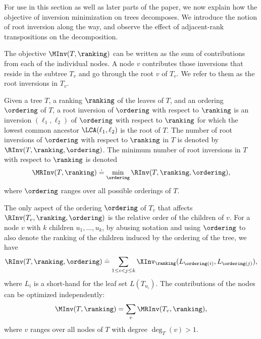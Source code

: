 For use in this section as well as later parts of the paper, we now explain how the objective of inversion minimization on trees decomposes. We introduce the notion of root inversion along the way, and observe the effect of adjacent-rank transpositions on the decomposition.

The objective $\MInv(T,\ranking)$ can be written as the sum of contributions from each of the individual nodes. A node $v$ contributes those inversions that reside in the subtree $T_v$ and go through the root $v$ of $T_v$. We refer to them as the root inversions in $T_v$. 
\begin{definition}
Given a tree $T$, a ranking $\ranking$ of the leaves of $T$, and an ordering $\ordering$ of $T$, a root inversion of $\ordering$ with respect to $\ranking$ is an inversion $(\ell_1,\ell_2)$ of $\ordering$ with respect to $\ranking$ for which the lowest common ancestor $\LCA(\ell_1,\ell_2)$ is the root of $T$. The number of root inversions of $\ordering$ with respect to $\ranking$ in $T$ is denoted by $\RInv(T,\ranking,\ordering)$. The minimum number of root inversions in $T$ with respect to $\ranking$ is denoted 
\begin{equation}\label{eq:MRInv}
\MRInv(T,\ranking) \doteq \min_\ordering \RInv(T,\ranking,\ordering),
\end{equation}
where $\ordering$ ranges over all possible orderings of $T$.
\end{definition}
The only aspect of the ordering $\ordering$ of $T_v$ that affects $\RInv(T_v,\ranking,\ordering)$ is the relative order of the children of $v$. For a node $v$ with $k$ children $u_1,\dots,u_k$, by abusing notation and using $\ordering$ to also denote the ranking of the children induced by the ordering of the tree, we have
\begin{equation}\label{eq:cost}
\RInv(T,\ranking,\ordering) \doteq \sum_{1 \le i < j \le k} \XInv_\ranking(L_{\ordering(i)},L_{\ordering(j)}),
\end{equation}
where $L_i$ is a short-hand for the leaf set $L(T_{u_i})$. The contributions of the nodes can be optimized independently:
\begin{equation}\label{eq:MInv:decomposition}
\MInv(T,\ranking) = \sum_v \MRInv(T_v,\ranking),
\end{equation}
where $v$ ranges over all nodes of $T$ with degree $\deg_T(v)>1$. 

